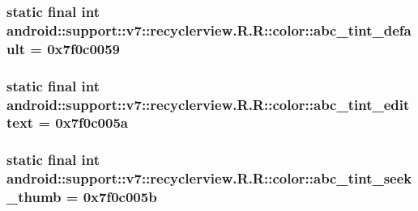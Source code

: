 \hypertarget{classandroid_1_1support_1_1v7_1_1recyclerview_1_1_r_1_1color_d02fc5e936bee5d8a94b2f53c45d5468}{
\subsubsection[{abc\_\-tint\_\-default}]{\setlength{\rightskip}{0pt plus 5cm}static final int android::support::v7::recyclerview.R.R::color::abc\_\-tint\_\-default = 0x7f0c0059}}
\label{classandroid_1_1support_1_1v7_1_1recyclerview_1_1_r_1_1color_d02fc5e936bee5d8a94b2f53c45d5468}


\hypertarget{classandroid_1_1support_1_1v7_1_1recyclerview_1_1_r_1_1color_1e23b150985b923c97af7c367f6a5ae1}{
\subsubsection[{abc\_\-tint\_\-edittext}]{\setlength{\rightskip}{0pt plus 5cm}static final int android::support::v7::recyclerview.R.R::color::abc\_\-tint\_\-edittext = 0x7f0c005a}}
\label{classandroid_1_1support_1_1v7_1_1recyclerview_1_1_r_1_1color_1e23b150985b923c97af7c367f6a5ae1}


\hypertarget{classandroid_1_1support_1_1v7_1_1recyclerview_1_1_r_1_1color_7426f17674a0fa32c6b112525e922def}{
\subsubsection[{abc\_\-tint\_\-seek\_\-thumb}]{\setlength{\rightskip}{0pt plus 5cm}static final int android::support::v7::recyclerview.R.R::color::abc\_\-tint\_\-seek\_\-thumb = 0x7f0c005b}}
\label{classandroid_1_1support_1_1v7_1_1recyclerview_1_1_r_1_1color_7426f17674a0fa32c6b112525e922def}


